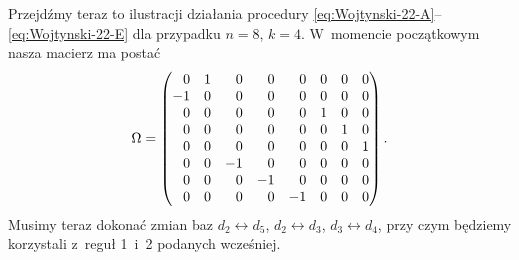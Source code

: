 \documentclass[a4paper,11pt]{article}
\numberwithin{equation}{section}
\begin{document}
Przejdźmy teraz to ilustracji działania procedury
\eqref{eq:Wojtynski-22-A}--\eqref{eq:Wojtynski-22-E} dla przypadku $n = 8$,
$k = 4$. W~momencie początkowym nasza macierz ma postać
\begin{equation}
  \label{eq:Wojtynski-24}
  \Omega =
  \begin{pmatrix}
    \hphantom{-} 0 & 1 & \hphantom{-} 0 & \hphantom{-} 0
    & \hphantom{-} 0 & 0 & 0 & 0 \\
    -1 & 0 & \hphantom{-} 0 & \hphantom{-} 0 & \hphantom{-} 0
                         & 0 & 0 & 0 \\
    \hphantom{-} 0 & 0 & \hphantom{-} 0 & \hphantom{-} 0
                     & \hphantom{-} 0 & 1 & 0 & 0 \\
    \hphantom{-} 0 & 0 & \hphantom{-} 0 & \hphantom{-} 0
                     & \hphantom{-} 0 & 0 & 1 & 0 \\
    \hphantom{-} 0 & 0 & \hphantom{-} 0 & \hphantom{-} 0
                     & \hphantom{-} 0 & 0 & 0 & 1 \\
    \hphantom{-} 0 & 0 & -1 & \hphantom{-} 0 & \hphantom{-} 0
                         & 0 & 0 & 0 \\
    \hphantom{-} 0 & 0 & \hphantom{-} 0 & -1 & \hphantom{-} 0
                         & 0 & 0 & 0 \\
    \hphantom{-} 0 & 0 & \hphantom{-} 0 & \hphantom{-} 0 & -1
                         & 0 & 0 & 0
  \end{pmatrix}.
\end{equation}
Musimy teraz dokonać zmian baz $d_{ 2 } \leftrightarrow d_{ 5 }$,
$d_{ 2 } \leftrightarrow d_{ 3 }$, $d_{ 3 } \leftrightarrow d_{ 4 }$, przy czym będziemy korzystali
z~reguł 1~i~2 podanych wcześniej.
\end{document}
